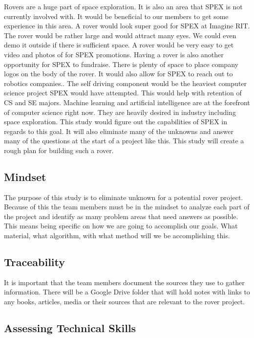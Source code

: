 \documentclass[conference]{IEEEtran} %
\begin{document}
Rovers are a huge part of space exploration. It is also an area that SPEX is not currently involved with. 
It would be beneficial to our members to get some experience in this area.
A rover would look super good for SPEX at Imagine RIT. 
The rover would be rather large and would attract many eyes. We could even demo it outside if there is sufficient space. 
A rover would be very easy to get video and photos of for SPEX promotions. 
Having a rover is also another opportunity for SPEX to fundraise. 
There is plenty of space to place company logos on the body of the rover. It would also allow for SPEX to reach out to robotics companies.. 
The self driving component would be the heaviest computer science project SPEX would have attempted. 
This would help with retention of CS and SE majors. 
Machine learning and artificial intelligence are at the forefront of computer science right now. 
They are heavily desired in industry including space exploration.
This study would figure out the capabilities of SPEX in regards to this goal. 
It will also eliminate many of the unknowns and answer many of the questions at the start of a project like this. 
This study will create a rough plan for building such a rover.




\subsection{Mindset}
\label{subsec:mindset}
The purpose of this study is to eliminate unknown for a potential rover project. 
Because of this the team members must be in the mindset to analyze each part of the project and identify as many problem areas that need answers as possible. 
This means being specific on how we are going to accomplish our goals. 
What material, what algorithm, with what method will we be accomplishing this.

\subsection{Traceability}
\label{subsec:traceability}

It is important that the team members document the sources they use to gather information. 
There will be a Google Drive folder that will hold notes with links to any books, articles, media or their sources that are relevant to the rover project. 

\subsection{Assessing Technical Skills}
\label{subsec:assessing-technical-skills}
\end{document}
